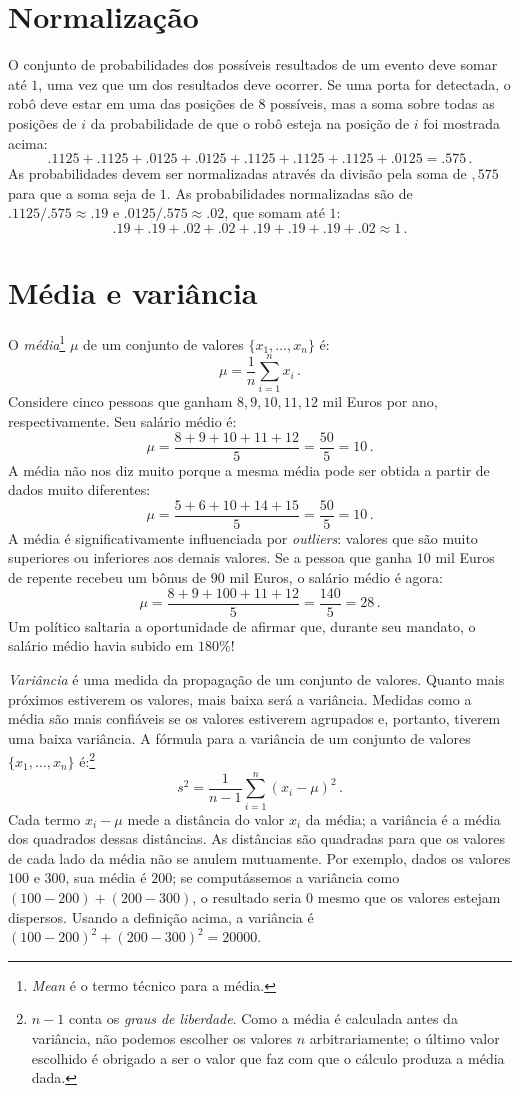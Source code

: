 \section{Normalização}\label{a.normalize}

O conjunto de probabilidades dos possíveis resultados de um evento deve somar até $1$, uma vez que um dos resultados deve ocorrer. Se uma porta for detectada, o robô deve estar em uma das posições de $8$ possíveis, mas a soma sobre todas as posições de $i$ da probabilidade de que o robô esteja na posição de $i$ foi mostrada acima:
\[
.1125 + .1125 + .0125 + .0125 + .1125 + .1125 + .1125 + .0125 = .575\,.
\]
As probabilidades devem ser {normalizadas} através da divisão pela soma de $,575$ para que a soma seja de $1$. As probabilidades normalizadas são de $.1125/.575 \approx .19$ e $.0125/.575 \approx .02$, que somam até $1$:
\[.19 + .19 + .02 + .02 + .19 + .19 + .19 + .02 \approx 1\,.\]

\section{Média e variância}\label{a.mean}

O \emph{média}\footnote{\textit{Mean} é o termo técnico para a média.} $\mu$ de um conjunto de valores $\{x_1,\ldots,x_n\}$ é:
\[
\mu = \frac{1}{n}\sum^n_{i=1} x_i\,.
\]
Considere cinco pessoas que ganham $8,9,10,11,12$ mil Euros por ano, respectivamente. Seu salário médio é:
\[
\mu = \frac{8+9+10+11+12}{5} = \frac{50}{5} = 10\,.
\]
A média não nos diz muito porque a mesma média pode ser obtida a partir de dados muito diferentes:
\[
\mu = \frac{5+6+10+14+15}{5} = \frac{50}{5} = 10\,.
\]
A média é significativamente influenciada por \emph{outliers}: valores que são muito superiores ou inferiores aos demais valores. Se a pessoa que ganha $10$ mil Euros de repente recebeu um bônus de $90$ mil Euros, o salário médio é agora:
\[
\mu = \frac{8+9+100+11+12}{5} = \frac{140}{5} = 28\,.
\]
Um político saltaria a oportunidade de afirmar que, durante seu mandato, o salário médio havia subido em $180\%$!

\emph{Variância} é uma medida da propagação de um conjunto de valores. Quanto mais próximos estiverem os valores, mais baixa será a variância. Medidas como a média são mais confiáveis se os valores estiverem agrupados e, portanto, tiverem uma baixa variância. A fórmula para a variância de um conjunto de valores $\{x_1,\ldots,x_n\}$ é:\footnote{$n-1$ conta os \emph{graus de liberdade}. Como a média é calculada antes da variância, não podemos escolher os valores $n$ arbitrariamente; o último valor escolhido é obrigado a ser o valor que faz com que o cálculo produza a média dada.}
\[
s^2 = \frac{1}{n-1}\sum^n_{i=1} (x_i-\mu)^2\,.
\]
Cada termo $x_i-\mu$ mede a distância do valor $x_i$ da média; a variância é a média dos quadrados dessas distâncias. As distâncias são quadradas para que os valores de cada lado da média não se anulem mutuamente. Por exemplo, dados os valores $100$ e $300$, sua média é $200$; se computássemos a variância como $(100-200)+(200-300)$, o resultado seria $0$ mesmo que os valores estejam dispersos. Usando a definição acima, a variância é $(100-200)^2+(200-300)^2=20000$.

